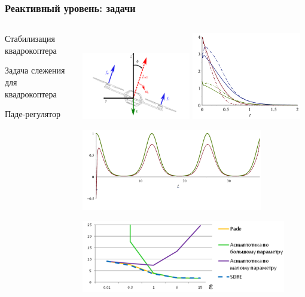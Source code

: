 \documentclass[default]{beamer}
\begin{document}
	\begin{frame}
		\frametitle{Реактивный уровень: задачи}
		
		\begin{columns}
			\begin{column}{0.4\textwidth}
				Стабилизация квадрокоптера
				\par\bigskip
				\par\bigskip
				\par\bigskip
				Задача слежения для квадрокоптера
				\par\bigskip
				\par\bigskip
				\par\bigskip
				Паде-регулятор				
			\end{column}
			\begin{column}{0.6\textwidth}
				\centering
				\includegraphics[width=0.48\textwidth]{stabil1.png}
				\includegraphics[width=0.48\textwidth]{stabil2.png}
				
				\includegraphics[width=0.8\textwidth]{predict.png}
				
				\includegraphics[width=0.9\textwidth]{pade.png}
			\end{column}
		\end{columns}
	\end{frame}
	
\end{document}
